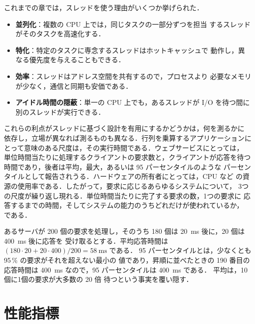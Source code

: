 \documentclass[../main.tex]{subfiles}
\begin{document}
これまでの章では，スレッドを使う理由がいくつか挙げられた．
\begin{itemize}
  \item \textbf{並列化}：複数の CPU 上では，同じタスクの一部分ずつを担当
    するスレッドがそのタスクを高速化する．
  \item \textbf{特化}：特定のタスクに専念するスレッドはホットキャッシュで
    動作し，異なる優先度を与えることもできる．
  \item \textbf{効率}：スレッドはアドレス空間を共有するので，プロセスより
    必要なメモリが少なく，通信と同期も安価である．
  \item \textbf{アイドル時間の隠蔽}：単一の CPU 上でも，あるスレッドが
    I/O を待つ間に別のスレッドが実行できる．
\end{itemize}
これらの利点がスレッドに基づく設計を有用にするかどうかは，何を測るかに
依存し，立場が異なれば測るものも異なる．行列を乗算するアプリケーションに
とって意味のある尺度は，その実行時間である．ウェブサービスにとっては，
単位時間当たりに処理するクライアントの要求数と，クライアントが応答を待つ
時間であり，後者は平均，最大，あるいは 95 パーセンタイルのような
パーセンタイルとして報告されうる．ハードウェアの所有者にとっては，CPU など
の資源の使用率である．したがって，要求に応じるあらゆるシステムについて，
3つの尺度が繰り返し現れる．単位時間当たりに完了する要求の数，1つの要求に
応答するまでの時間，そしてシステムの能力のうちどれだけが使われているか，
である．%

\begin{example}
  あるサーバが 200 個の要求を処理し，そのうち 180 個は
  \SI{20}{\milli\second} 後に，20 個は \SI{400}{\milli\second} 後に応答を
  受け取るとする．平均応答時間は
  $(180 \cdot 20 + 20 \cdot 400)/200 = \SI{58}{\milli\second}$ である．
  95 パーセンタイルとは，少なくとも 95\,\% の要求がそれを超えない最小の
  値であり，昇順に並べたときの 190 番目の応答時間は
  \SI{400}{\milli\second} なので，95 パーセンタイルは
  \SI{400}{\milli\second} である．%
  平均は，10 個に1個の要求が大多数の 20 倍
  待つという事実を覆い隠す．
\end{example}

\section{性能指標}
\label{sec:l06-metrics}
\end{document}
